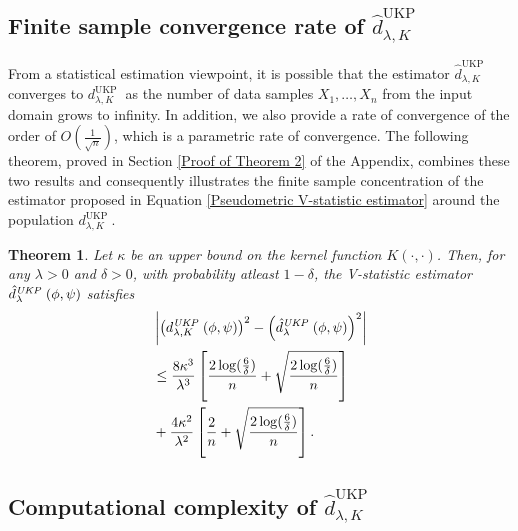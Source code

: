 \documentclass{article}
\theoremstyle{plain}
\newcounter{theoremno}
\newtheorem{theorem}[theoremno]{Theorem}
\newcommand{\repone}{\phi}
\newcommand{\reptwo}{\psi}
\newcommand{\metricstname}{UKP }
\begin{document}
\subsection{Finite sample convergence rate of $\hat{d}_{\lambda,K}^{\text{\metricstname}}$} \label{Finite sample convergence rate}

From a statistical estimation viewpoint, it is possible that the estimator $\hat{d}_{\lambda,K}^{\text{\metricstname}}$ converges to $d_{\lambda,K}^{\text{\metricstname}}$ as the number of data samples $X_{1},\dots,X_{n}$ from the input domain grows to infinity. In addition, we also provide a rate of convergence of the order of $O(\frac{1}{\sqrt{n}})$, which is a parametric rate of convergence. The following theorem, proved in Section \ref{Proof of Theorem 2} of the Appendix, combines these two results and consequently illustrates the finite sample concentration of the  estimator proposed in Equation \eqref{Pseudometric V-statistic estimator} around the population $d_{\lambda,K}^{\text{\metricstname}}$.

\begin{theorem} \label{Theorem: Finite sample convergence}
    Let $\kappa$ be an upper bound on the kernel function $K(\cdot,\cdot)$. Then, for any $\lambda>0$ and $\delta>0$, with probability atleast $1-\delta$, the V-statistic estimator $\hat{d}_{\lambda}^{\emph{\metricstname}}(\repone,\reptwo)$ satisfies
    \[
    \begin{aligned}
    &\left|\left(d_{\lambda,K}^{\emph{\metricstname}}(\repone,\reptwo)\right)^{2}-\left(\hat{d}_{\lambda}^{\emph{\metricstname}}(\repone,\reptwo)\right)^{2}\right|\\
    &\leq \frac{8\kappa^{3}}{\lambda^{3}}\left[\frac{2\log(\frac{6}{\delta})}{n} + \sqrt{\frac{2\log(\frac{6}{\delta})}{n}}\right] \\
    &+ \frac{4\kappa^{2}}{\lambda^{2}}\left[\frac{2}{n} + \sqrt{\frac{2\log(\frac{6}{\delta})}{n}}\right] .
    \end{aligned}
    \]
\end{theorem}

\subsection{Computational complexity of $\hat{d}_{\lambda,K}^{\text{\metricstname}}$}
\end{document}
